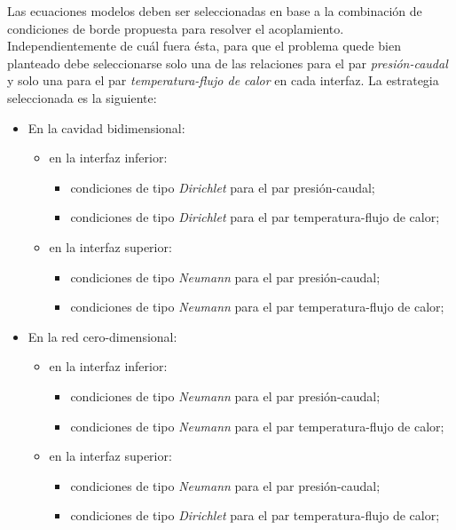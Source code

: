 Las ecuaciones modelos deben ser seleccionadas en base a la combinación de condiciones de borde propuesta para resolver el acoplamiento.
Independientemente de cuál fuera ésta,
para que el problema quede bien planteado debe seleccionarse solo una de las relaciones para el par \textit{presión-caudal}
y solo una para el par \textit{temperatura-flujo de calor} en cada interfaz.
La estrategia seleccionada es la siguiente:
\begin{itemize}
\item En la cavidad bidimensional:
  \begin{itemize}
  \item en la interfaz inferior:
    \begin{itemize}
    \item condiciones de tipo \textit{Dirichlet} para el par presión-caudal;
    \item condiciones de tipo \textit{Dirichlet} para el par temperatura-flujo de calor;
    \end{itemize}
  \item en la interfaz superior:
    \begin{itemize}
    \item condiciones de tipo \textit{Neumann} para el par presión-caudal;
    \item condiciones de tipo \textit{Neumann} para el par temperatura-flujo de calor;
    \end{itemize}
  \end{itemize}
\item En la red cero-dimensional:
  \begin{itemize}
  \item en la interfaz inferior:
    \begin{itemize}
    \item condiciones de tipo \textit{Neumann} para el par presión-caudal;
    \item condiciones de tipo \textit{Neumann} para el par temperatura-flujo de calor;
    \end{itemize}
  \item en la interfaz superior:
    \begin{itemize}
    \item condiciones de tipo \textit{Neumann} para el par presión-caudal;
    \item condiciones de tipo \textit{Dirichlet} para el par temperatura-flujo de calor;
    \end{itemize}
  \end{itemize}
\end{itemize}    
    
